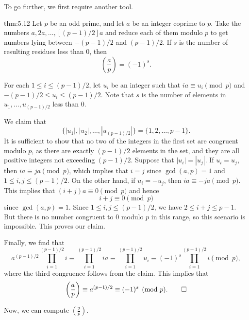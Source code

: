 To go further, we first require another tool. 

\begin{theo}{thm:5.12}
    Let $p$ be an odd prime, and let $a$ be an integer coprime to $p$. 
    Take the numbers $a, 2a, \dots, [(p-1)/2]a$ and reduce each of them modulo $p$
    to get numbers lying between $-(p-1)/2$ and $(p-1)/2$. If $s$ is the number 
    of resulting residues less than $0$, then 
    \[ \left( \frac ap \right) = (-1)^s. \] 
\end{theo}
\begin{pf}
    For each $1 \leq i \leq (p-1)/2$, let $u_i$ be an integer such that 
    $ia \equiv u_i \pmod p$ and $-(p-1)/2 \leq u_i \leq (p-1)/2$. Note that $s$ 
    is the number of elements in $u_1, \dots, u_{(p-1)/2}$ less than $0$. 

    We claim that 
    \[ \{|u_1|, |u_2|, \dots, |u_{(p-1)/2}|\} = \{1, 2, \dots, p-1\}. \] 
    It is sufficient to show that no two of the integers in the first set are 
    congruent modulo $p$, as there are exactly $(p-1)/2$ elements in the set, 
    and they are all positive integers not exceeding $(p-1)/2$. Suppose that 
    $|u_i| = |u_j|$. If $u_i = u_j$, then $ia \equiv ja \pmod p$, which implies 
    that $i = j$ since $\gcd(a, p) = 1$ and $1 \leq i, j \leq (p-1)/2$. 
    On the other hand, if $u_i = -u_j$, then $ia \equiv -ja \pmod p$. 
    This implies that $(i+j)a \equiv 0 \pmod p$ and hence 
    \[ i + j \equiv 0 \pmod p \] 
    since $\gcd(a, p) = 1$. Since $1 \leq i, j \leq (p-1)/2$, we have 
    $2 \leq i+j \leq p-1$. But there is no number congruent to $0$ modulo $p$ 
    in this range, so this scenario is impossible. This proves our claim. 

    Finally, we find that 
    \[ a^{(p-1)/2} \prod_{i=1}^{(p-1)/2} i 
    \equiv \prod_{i=1}^{(p-1)/2} ia 
    \equiv \prod_{i=1}^{(p-1)/2} u_i 
    \equiv (-1)^s \prod_{i=1}^{(p-1)/2} i \pmod p, \] 
    where the third congruence follows from the claim. This implies that 
    \[ \left( \frac ap \right) \equiv a^{(p-1)/2} \equiv (-1)^s \pmod p. \qedhere \] 
\end{pf}

Now, we can compute $(\frac2p)$. 

